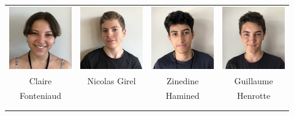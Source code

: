 \begin{center}
\begin{tabular}{cccc}
\includegraphics[angle=270,origin=c, width=27mm]{eleves/Fonteniaud Claire.JPG} &
\includegraphics[angle=270,origin=c, width=27mm]{eleves/Girel Nicolas.JPG} &
\includegraphics[angle=270,origin=c, width=27mm]{eleves/Hamimed Zinedine.JPG} &
\includegraphics[angle=270,origin=c, width=27mm]{eleves/Henrotte Guillaume.JPG} \\
Claire & Nicolas Girel & Zinedine & Guillaume \\ Fonteniaud & & Hamined & Henrotte \\ \\ \\ 


\end{tabular}
\end{center}
